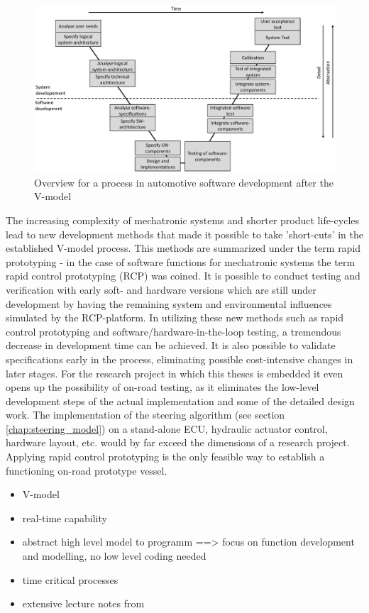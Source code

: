 \documentclass[ExampleMasters.tex]{subfiles}
\begin{document}
\begin{figure}[htpb]
\centering
\includegraphics[width=0.9\linewidth]{figures/v_model/Folie1}
\caption{Overview for a process in automotive software development after the V-model}
\label{fig:v_model}
\end{figure}



The increasing complexity of mechatronic systems and shorter product life-cycles lead to new development methods that made it possible to take 'short-cuts' in the established V-model process. This methods are summarized under the term rapid prototyping - in the case of software functions for mechatronic systems the term rapid control prototyping (RCP) was coined. It is possible to conduct testing and verification with early soft- and hardware versions which are still under development by having the remaining system and environmental influences simulated by the RCP-platform. In utilizing these new methods such as rapid control prototyping and software/hardware-in-the-loop testing, a tremendous decrease in development time can be achieved. It is also possible to validate specifications early in the process, eliminating possible cost-intensive changes in later stages.\cite{rapidcontrolprototyping} For the research project in which this theses is embedded it even opens up the possibility of on-road testing, as it eliminates the low-level development steps of the actual implementation and some of the detailed design work. The implementation of the steering algorithm (see section \ref{chap:steering_model}) on a stand-alone ECU, hydraulic actuator control, hardware layout, etc. would by far exceed the dimensions of a research project. Applying rapid control prototyping is the only feasible way to establish a functioning on-road prototype vessel.


\begin{itemize}
	\item V-model
	\item real-time capability
	\item abstract high level model to programm ==> focus on function development and modelling, no low level coding needed
	\item time critical processes
	\item extensive lecture notes from \cite{rapidcontrolprototyping}
\end{itemize}
\end{document}
